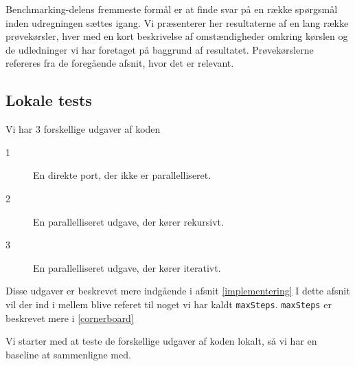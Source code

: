 Benchmarking-delens fremmeste formål er at finde svar på en række spørgsmål
inden udregningen sættes igang. Vi præsenterer her resultaterne af en lang række prøvekørsler, hver med en kort beskrivelse af omstændigheder omkring kørslen og de udledninger vi har foretaget på baggrund af resultatet. Prøvekørslerne refereres fra de foregående afsnit, hvor det er relevant.

\subsection{Lokale tests}

Vi har 3 forskellige udgaver af koden
\begin{description}
\item[1] En direkte port, der ikke er parallelliseret.
\item[2] En parallelliseret udgave, der kører rekursivt.
\item[3] En parallelliseret udgave, der kører iterativt.
\end{description}

Disse udgaver er beskrevet mere indgående i afsnit \ref{implementering}
I dette afsnit vil der ind i mellem blive referet til noget vi har kaldt
\texttt{maxSteps}. \texttt{maxSteps} er beskrevet mere i \ref{cornerboard} 

Vi starter med at teste de forskellige udgaver af koden lokalt, så vi har en
baseline at sammenligne med.

